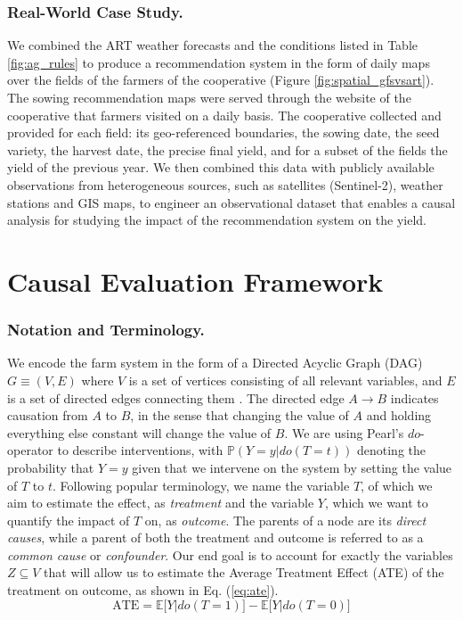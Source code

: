 \documentclass[letterpaper]{article} %
\begin{document}
\subsubsection{Real-World Case Study.}


We combined the ART weather forecasts and the conditions listed in Table \ref{fig:ag_rules} to produce a recommendation system in the form of daily maps over the fields of the farmers of the cooperative (Figure \ref{fig:spatial_gfsvsart}). The sowing recommendation maps were served through the website of the cooperative that farmers visited on a daily basis.
The cooperative collected and provided for each field: its geo-referenced boundaries, the sowing date, the seed variety, the harvest date, the precise final yield, and for a subset of the fields the yield of the previous year. We then combined this data with publicly available observations from heterogeneous sources, such as satellites (Sentinel-2), weather stations and GIS maps, to engineer an observational dataset that enables a causal analysis for studying the impact of the recommendation system on the yield.

\section{Causal Evaluation Framework}

\subsubsection{Notation and Terminology.}

We encode the farm system in the form of a Directed Acyclic Graph (DAG) $G \equiv (V,E)$ where $V$ is a set of vertices consisting of all relevant variables, and $E$ is a set of directed edges connecting them \cite{pearl2009causality}. The directed edge $A \rightarrow B$ indicates causation from $A$ to $B$, in the sense that changing the value of $A$ and holding everything else constant will change the value of $B$. We are using Pearl's $do$-operator to describe interventions, with $\mathbb{P}(Y=y|do(T=t))$ denoting the probability that $Y = y$ given that we intervene on the system by setting the value of $T$ to $t$. Following popular terminology, we name the variable $T$, of which we aim to estimate the effect, as \textit{treatment} and the variable $Y$, which we want to quantify the impact of $T$ on, as \textit{outcome}. The parents of a node are its \textit{direct causes}, while a parent of both the treatment and outcome is referred to as a \textit{common cause} or \textit{confounder}. Our end goal is to account for exactly the variables $Z \subseteq V$ that will allow us to estimate the Average Treatment Effect (ATE) of the treatment on outcome, as shown in Eq. (\ref{eq:ate}).
\begin{equation}\label{eq:ate}
\text{ATE} = \mathbb{E}\big[Y|do(T=1)\big] - \mathbb{E}\big[Y|do(T=0)\big]
\end{equation}
\end{document}
